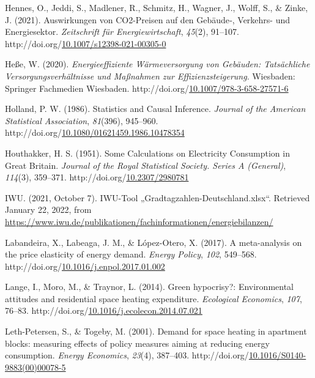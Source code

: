 \documentclass[12pt,twoside]{reedthesis}
\newlength{\cslhangindent}
\newenvironment{CSLReferences}[2] %
 {%
  \setlength{\parindent}{0pt}
  \ifodd #1 \everypar{\setlength{\hangindent}{\cslhangindent}}\ignorespaces\fi
  \ifnum #2 > 0
  \setlength{\parskip}{#2\baselineskip}
  \fi
 }%
 {}
\begin{document}
\begin{CSLReferences}{1}{0}
\leavevmode{}%
Hennes, O., Jeddi, S., Madlener, R., Schmitz, H., Wagner, J., Wolff, S., \& Zinke, J. (2021). Auswirkungen von CO2-Preisen auf den Gebäude‑, Verkehrs- und Energiesektor. \emph{Zeitschrift für Energiewirtschaft}, \emph{45}(2), 91--107. http://doi.org/\href{https://doi.org/10.1007/s12398-021-00305-0}{10.1007/s12398-021-00305-0}

\leavevmode{}%
Heße, W. (2020). \emph{Energieeffiziente Wärmeversorgung von Gebäuden: Tatsächliche Versorgungsverhältnisse und Maßnahmen zur Effizienzsteigerung}. Wiesbaden: Springer Fachmedien Wiesbaden. http://doi.org/\href{https://doi.org/10.1007/978-3-658-27571-6}{10.1007/978-3-658-27571-6}

\leavevmode{}%
Holland, P. W. (1986). Statistics and Causal Inference. \emph{Journal of the American Statistical Association}, \emph{81}(396), 945--960. http://doi.org/\href{https://doi.org/10.1080/01621459.1986.10478354}{10.1080/01621459.1986.10478354}

\leavevmode{}%
Houthakker, H. S. (1951). Some Calculations on Electricity Consumption in Great Britain. \emph{Journal of the Royal Statistical Society. Series A (General)}, \emph{114}(3), 359--371. http://doi.org/\href{https://doi.org/10.2307/2980781}{10.2307/2980781}

\leavevmode{}%
IWU. (2021, October 7). IWU-Tool „Gradtagzahlen-Deutschland.xlsx``. Retrieved January 22, 2022, from \url{https://www.iwu.de/publikationen/fachinformationen/energiebilanzen/}

\leavevmode{}%
Labandeira, X., Labeaga, J. M., \& López-Otero, X. (2017). A meta-analysis on the price elasticity of energy demand. \emph{Energy Policy}, \emph{102}, 549--568. http://doi.org/\href{https://doi.org/10.1016/j.enpol.2017.01.002}{10.1016/j.enpol.2017.01.002}

\leavevmode{}%
Lange, I., Moro, M., \& Traynor, L. (2014). Green hypocrisy?: Environmental attitudes and residential space heating expenditure. \emph{Ecological Economics}, \emph{107}, 76--83. http://doi.org/\href{https://doi.org/10.1016/j.ecolecon.2014.07.021}{10.1016/j.ecolecon.2014.07.021}

\leavevmode{}%
Leth-Petersen, S., \& Togeby, M. (2001). Demand for space heating in apartment blocks: measuring effects of policy measures aiming at reducing energy consumption. \emph{Energy Economics}, \emph{23}(4), 387--403. http://doi.org/\href{https://doi.org/10.1016/S0140-9883(00)00078-5}{10.1016/S0140-9883(00)00078-5}


\end{CSLReferences}
\end{document}
